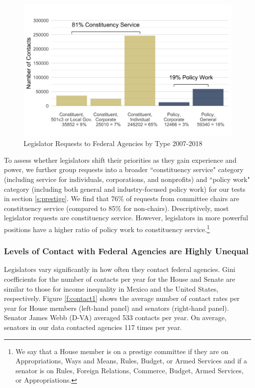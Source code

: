 \documentclass[12pt]{article}
\begin{document}
\begin{figure}[hbt!]
\centering
\caption{Legislator Requests to Federal Agencies by Type 2007-2018} \label{f:type2}
\includegraphics[width = .8\textwidth]{figs/data_by_type-tall-1}
\end{figure}



To assess whether legislators shift their priorities as they gain experience and power, we further group requests into a broader ``constituency service"  category (including service for individuals, corporations, and nonprofits) and ``policy work" category (including both general and industry-focused policy work) for our tests in section \ref{s:prestige}. We find that 76\% of requests from committee chairs are constituency service (compared to 85\% for non-chairs). %
Descriptively, most legislator requests are constituency service. However, legislators in more powerful positions have a higher ratio of policy work to constituency service.\footnote{We say that a House member is on a prestige committee if they are on Appropriations, Ways and Means, Rules, Budget, or Armed Services and if a senator is on Rules, Foreign Relations, Commerce, Budget, Armed Services, or Appropriations.} %


\subsubsection{Levels of Contact with Federal Agencies are Highly Unequal}
Legislators vary significantly in how often they contact federal agencies. Gini coefficients for the number of contacts per year for the House and Senate are similar to those for income inequality in Mexico and the United States, respectively. Figure \ref{f:contact1} shows the average number of contact rates per year for House members (left-hand panel) and senators (right-hand panel). Senator James Webb (D-VA) averaged 533 contacts per year. %
On average, senators in our data contacted agencies 117 times per year.   
 
\end{document}
